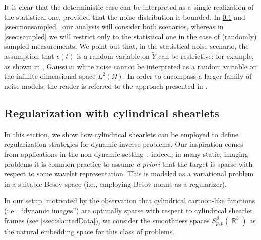 \documentclass[11pt,a4paper]{article}
\numberwithin{equation}{section}
\DeclareMathOperator{\R}{\mathbb{R}}
\begin{document}
It is clear that the deterministic case can be interpreted as a single realization of the statistical one, provided that the noise distribution is bounded. In  \cref{ssec:regularizingCylindrical} and \cref{ssec:nonsampled}, our analysis will consider both scenarios, whereas in  \cref{ssec:sampled} we will restrict only to the statistical one in the case of (randomly) sampled measurements. 
We point out that, in the statistical noise scenario, the assumption that $\epsilon(t)$ is a random variable on $\tilde{Y}$ can be restrictive: for example, as shown in \cite{kekkonen2014analysis}, Gaussian white noise cannot be interpreted as a random variable on the infinite-dimensional space $L^2(\Omega)$. In order to encompass a larger family of noise models, the reader is referred to the approach presented in \cite{burger2018large}.

\subsection{Regularization with cylindrical shearlets}
\label{ssec:regularizingCylindrical}
In this section, we show how cylindrical shearlets can be employed to define regularization strategies for dynamic inverse problems. Our inspiration comes from applications in the non-dynamic setting~\cite{chambolle1998nonlinear, rantala2006wavelet}:
indeed, in many static, imaging problems 
it is common practice to assume \textit{a priori} that the target is sparse 
with respect to some wavelet representation. This is modeled as a variational problem in a suitable Besov space (i.e., employing Besov norms as a regularizer).

In our setup, motivated by the observation that cylindrical cartoon-like functions (i.e., ``dynamic images'') are optimally sparse with respect to cylindrical shearlet frames (see \cref{ssec:slantedData}), we consider the smoothness spaces $S_{p,p}^\beta(\R^3)$ as the natural 
embedding space for this class of problems. 
\end{document}

